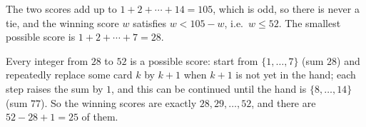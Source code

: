 The two scores add up to $1+2+\cdots+14=105$, which is odd, so there is never a tie, and the winning score $w$ satisfies $w<105-w$, i.e.\ $w\le52$. The smallest possible score is $1+2+\cdots+7=28$.

Every integer from $28$ to $52$ is a possible score: start from $\{1,\dots,7\}$ (sum $28$) and repeatedly replace some card $k$ by $k+1$ when $k+1$ is not yet in the hand; each step raises the sum by $1$, and this can be continued until the hand is $\{8,\dots,14\}$ (sum $77$). So the winning scores are exactly $28,29,\dots,52$, and there are $52-28+1=\boxed{25}$ of them.
